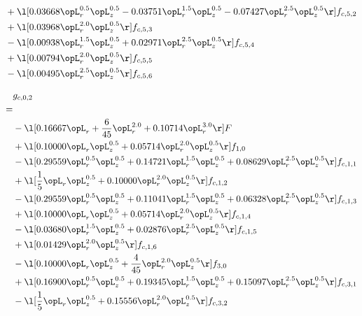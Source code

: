 \begin{alignat}{2}
& + \l[  0.03668 \opL_r^{0.5} \opL_z^{0.5}   -0.03751 \opL_r^{1.5} \opL_z^{0.5}   -0.07427 \opL_r^{2.5} \opL_z^{0.5}  \r] f_{c,5,2} \nonumber \\ 
& + \l[  0.03968 \opL_r^{2.0} \opL_z^{0.5}  \r] f_{c,5,3} \nonumber \\ 
& - \l[  0.00938 \opL_r^{1.5} \opL_z^{0.5} +  0.02971 \opL_r^{2.5} \opL_z^{0.5}  \r] f_{c,5,4} \nonumber \\ 
& + \l[  0.00794 \opL_r^{2.0} \opL_z^{0.5}  \r] f_{c,5,5} \nonumber \\ 
& - \l[  0.00495 \opL_r^{2.5} \opL_z^{0.5}  \r] f_{c,5,6} \nonumber \\ 
\end{alignat} 


\begin{alignat}{2} 
\label{eq:g_02_0} 
& g_{c,0,2} \nonumber \\ 
 = \\ 
& - \l[  0.16667 \opL_r + \frac{6}{45} \opL_r^{2.0} +  0.10714 \opL_r^{3.0}  \r] F \nonumber \\ 
& + \l[  0.10000 \opL_r \opL_z^{0.5} +  0.05714 \opL_r^{2.0} \opL_z^{0.5}  \r] f_{1,0} \nonumber \\ 
& - \l[  0.29559 \opL_r^{0.5} \opL_z^{0.5} +  0.14721 \opL_r^{1.5} \opL_z^{0.5} +  0.08629 \opL_r^{2.5} \opL_z^{0.5}  \r] f_{c,1,1} \nonumber \\ 
& + \l[ \frac{1}{5} \opL_r \opL_z^{0.5} +  0.10000 \opL_r^{2.0} \opL_z^{0.5}  \r] f_{c,1,2} \nonumber \\ 
& - \l[  0.29559 \opL_r^{0.5} \opL_z^{0.5} +  0.11041 \opL_r^{1.5} \opL_z^{0.5} +  0.06328 \opL_r^{2.5} \opL_z^{0.5}  \r] f_{c,1,3} \nonumber \\ 
& + \l[  0.10000 \opL_r \opL_z^{0.5} +  0.05714 \opL_r^{2.0} \opL_z^{0.5}  \r] f_{c,1,4} \nonumber \\ 
& - \l[  0.03680 \opL_r^{1.5} \opL_z^{0.5} +  0.02876 \opL_r^{2.5} \opL_z^{0.5}  \r] f_{c,1,5} \nonumber \\ 
& + \l[  0.01429 \opL_r^{2.0} \opL_z^{0.5}  \r] f_{c,1,6} \nonumber \\ 
& - \l[  0.10000 \opL_r \opL_z^{0.5} + \frac{4}{45} \opL_r^{2.0} \opL_z^{0.5}  \r] f_{3,0} \nonumber \\ 
& + \l[  0.16900 \opL_r^{0.5} \opL_z^{0.5} +  0.19345 \opL_r^{1.5} \opL_z^{0.5} +  0.15097 \opL_r^{2.5} \opL_z^{0.5}  \r] f_{c,3,1} \nonumber \\ 
& - \l[ \frac{1}{5} \opL_r \opL_z^{0.5} +  0.15556 \opL_r^{2.0} \opL_z^{0.5}  \r] f_{c,3,2} \nonumber \\ 

\end{alignat}
